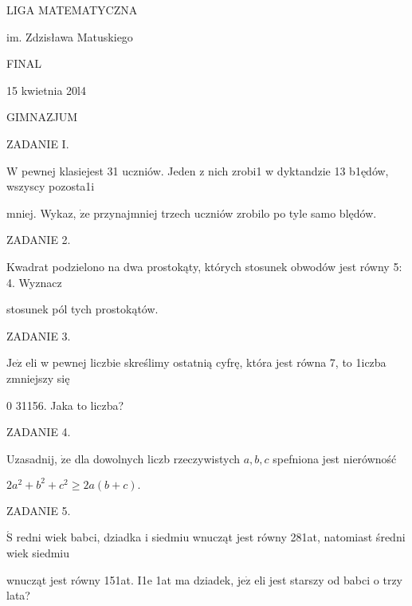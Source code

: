\documentclass[a4paper,12pt]{article}
\begin{document}
LIGA MATEMATYCZNA

im. Zdzisława Matuskiego

FINAL

15 kwietnia 20l4

GIMNAZJUM

ZADANIE I.

$\mathrm{W}$ pewnej klasiejest 31 uczniów. Jeden z nich zrobi1 w dyktandzie 13 b1ędów, wszyscy pozosta1i

mniej. Wykaz, $\dot{\mathrm{z}}\mathrm{e}$ przynajmniej trzech uczniów zrobilo po tyle samo blędów.

ZADANIE 2.

Kwadrat podzielono na dwa prostokąty, których stosunek obwodów jest równy 5: 4. Wyznacz

stosunek pól tych prostokątów.

ZADANIE 3.

$\mathrm{J}\mathrm{e}\dot{\mathrm{z}}$ eli w pewnej liczbie skreślimy ostatnią cyfrę, która jest równa 7, to 1iczba zmniejszy się

$0$ 31156. Jaka to liczba?

ZADANIE 4.

Uzasadnij, $\dot{\mathrm{z}}\mathrm{e}$ dla dowolnych liczb rzeczywistych $a, b, c$ spefniona jest nierówność

$2a^{2}+b^{2}+c^{2}\geq 2a(b+c).$

ZADANIE 5.

$\acute{\mathrm{S}}$ redni wiek babci, dziadka i siedmiu wnucząt jest równy 281at, natomiast średni wiek siedmiu

wnucząt jest równy 151at. I1e 1at ma dziadek, $\mathrm{j}\mathrm{e}\dot{\mathrm{z}}$ eli jest starszy od babci o trzy lata?
\end{document}
